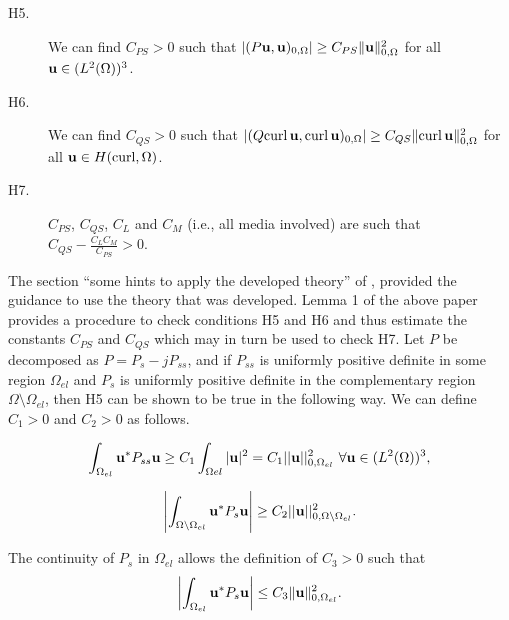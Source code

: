 \begin{description}
  \item[H5.]
    We can find $C_{PS} > 0$ such that 
    $|(P {\bf u}, {\bf u})_{0,\Omega}| 
    \ge 
    C_{PS} \| {\bf u} \|_{0,\Omega}^2$ 
    for all ${\bf u} \in (L^2(\Omega))^3$.
\end{description}
%
\begin{description}
  \item[H6.]
    We can find $C_{QS} > 0$ such that 
    $|(Q \mathrm{curl} \, {\bf u}, \mathrm{curl} \, {\bf u})_{0,\Omega}| 
    \ge 
    C_{QS} \| \mathrm{curl} \, {\bf u} \|_{0,\Omega}^2$ 
    for all ${\bf u} \in H(\mathrm{curl}, \Omega)$.
\end{description}
% 

\begin{description}
  \item[H7.]
    $C_{PS}$, $C_{QS}$, $C_L$ and $C_M$ (i.e., all media involved) 
    are such that  $C_{QS} - \frac{C_L C_M}{C_{PS}} > 0$.
\end{description}
%

The section ``some hints to apply the developed theory'' 
of \cite{kalarickel2020well}, provided the guidance to use 
the theory that was developed.
Lemma 1 of the above paper provides a procedure to check 
conditions H5 and H6 and thus estimate the constants 
$C_{PS}$ and $C_{QS}$ which may in turn be used to check H7. 
Let $P$ be decomposed as $P=P_s - jP_{ss}$, and if 
$P_{ss}$ is uniformly positive definite in some region $\Omega_{el}$
and $P_s$ is uniformly positive definite in the complementary region 
$\Omega \setminus \Omega_{el}$, then H5 can be shown to be true 
in the following way.
We can define $C_1 >0$ and $C_2 >0$ as follows.

\begin{equation} \label{eq:c1_constant}
    \int_{\Omega_{el}}{\bf u}^*P_{ss}{\bf u} \geq C_1 \int_{\Omega{el}}|{\bf u}|^2 = C_1 ||{\bf u}||^2_{0, \Omega_{el}} \hbox{   } \forall {\bf u} \in (L^2(\Omega))^3,
\end{equation}

\begin{equation} \label{eq:c2_constant}
    \left|\int_{\Omega \setminus \Omega_{el}} {\bf u}^*P_s{\bf u}\right| \geq C_2||{\bf u}||^2_{0,\Omega \setminus \Omega_{el}}.
\end{equation}

The continuity of $P_s$ in $\Omega_{el}$ allows the definition of $C_3 > 0$ such that 
  \begin{equation} \label{eq:c3_constant}
    \left| \int_{\Omega_{el}} {\bf u}^* P_s {\bf u} \right| \le 
      C_3 \|{\bf u}\|^2_{0,\Omega_{el}}.
  \end{equation}


